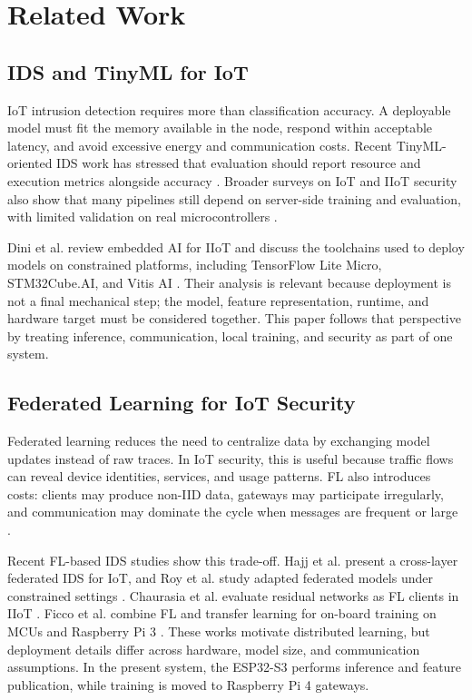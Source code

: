 \documentclass[runningheads]{llncs}
\begin{document}
\section{Related Work}

\subsection{IDS and TinyML for IoT}

IoT intrusion detection requires more than classification accuracy. A deployable model must fit the memory available in the node, respond within acceptable latency, and avoid excessive energy and communication costs. Recent TinyML-oriented IDS work has stressed that evaluation should report resource and execution metrics alongside accuracy \cite{Tekin2023_OnDeviceEnergy,Alwaisi2024,Amuthadevi2025,HeydariMahmoud2025_TinyML_IDS}. Broader surveys on IoT and IIoT security also show that many pipelines still depend on server-side training and evaluation, with limited validation on real microcontrollers \cite{Amanullah2020_DL_BigData_IoT_Security,Ni2024_IIoT_Security_Survey}.

Dini et al. review embedded AI for IIoT and discuss the toolchains used to deploy models on constrained platforms, including TensorFlow Lite Micro, STM32Cube.AI, and Vitis AI \cite{Dini2024_EmbeddedIIoT_Review}. Their analysis is relevant because deployment is not a final mechanical step; the model, feature representation, runtime, and hardware target must be considered together. This paper follows that perspective by treating inference, communication, local training, and security as part of one system.

\subsection{Federated Learning for IoT Security}

Federated learning reduces the need to centralize data by exchanging model updates instead of raw traces. In IoT security, this is useful because traffic flows can reveal device identities, services, and usage patterns. FL also introduces costs: clients may produce non-IID data, gateways may participate irregularly, and communication may dominate the cycle when messages are frequent or large \cite{Imteaj2022_FL_ResourceConstrainedSurvey,Albanbay2025}.

Recent FL-based IDS studies show this trade-off. Hajj et al. present a cross-layer federated IDS for IoT, and Roy et al. study adapted federated models under constrained settings \cite{Hajj2023_CrossLayerFL_IDS,Roy2023_FL_AdaptedModel}. Chaurasia et al. evaluate residual networks as FL clients in IIoT \cite{Chaurasia2024_FL_ResNet_IIoT}. Ficco et al. combine FL and transfer learning for on-board training on MCUs and Raspberry Pi 3 \cite{Ficco2024_FL_TinyML_Onboard}. These works motivate distributed learning, but deployment details differ across hardware, model size, and communication assumptions. In the present system, the ESP32-S3 performs inference and feature publication, while training is moved to Raspberry Pi 4 gateways.
\end{document}
